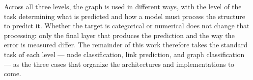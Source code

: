 Across all three levels, the graph is used in different ways, with the level of
the task determining what is predicted and how a model must process the
structure to predict it. Whether the target is categorical or numerical does not
change that processing: only the final layer that produces the prediction and
the way the error is measured differ. The remainder of this work therefore takes
the standard task of each level --- node classification, link prediction,
and graph classification --- as the three cases that organize the
architectures and implementations to come.
